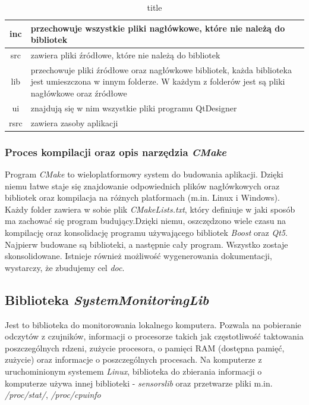 \documentclass[a4paper]{article}
\begin{document}
\begin{table}
\centering
\begin{tabularx}{0.7\linewidth}{|c|X|}
	\hline
	inc & przechowuje wszystkie pliki nagłówkowe, które nie należą do bibliotek \\ \hline
	src & zawiera pliki źródłowe, które nie należą do bibliotek \\ \hline
	lib & przechowuje pliki źródłowe oraz nagłówkowe bibliotek, każda biblioteka jest umieszczona 
		  w innym folderze. W każdym z folderów jest są pliki nagłówkowe oraz źródłowe \\ \hline
	ui & znajdują się w nim wszystkie pliki  programu QtDesigner \\ \hline
	rsrc  & zawiera zasoby aplikacji \\ \hline
\end{tabularx}

\label{opis_folderow_prj}
\caption{title}
\end{table}

\subsubsection{Proces kompilacji oraz opis narzędzia \textit{CMake}}
Program \textit{CMake} to wieloplatformowy system do budowania aplikacji. Dzięki niemu łatwe staje się
znajdowanie odpowiednich plików nagłówkowych oraz bibliotek oraz kompilacja na różnych platformach (m.in. Linux i Windows). Każdy folder zawiera w sobie plik \textit{CMakeLists.txt}, który definiuje w jaki sposób ma zachować się program budujący.Dzięki niemu, oszczędzono wiele czasu na kompilację oraz konsolidację programu używającego bibliotek \textit{Boost} oraz \textit{Qt5}. Najpierw budowane są biblioteki, a następnie cały program. Wszystko zostaje skonsolidowane. Istnieje również możliwość wygenerowania dokumentacji, wystarczy, że zbudujemy cel \textit{doc}.

\subsection{Biblioteka \textit{SystemMonitoringLib}}
Jest to biblioteka do monitorowania lokalnego komputera. Pozwala na pobieranie odczytów z czujników, informacji o procesorze takich jak częstotliwość taktowania poszczególnych rdzeni, zużycie procesora, o pamięci RAM (dostępna pamięć, zużycie) oraz informacje o poszczególnych procesach. Na komputerze z uruchominionym systemem \textit{Linux}, biblioteka do zbierania informacji o komputerze używa innej biblioteki - \textit{sensorslib} oraz przetwarze pliki m.in. \textit{/proc/stat/}, \textit{/proc/cpuinfo}
\end{document}
